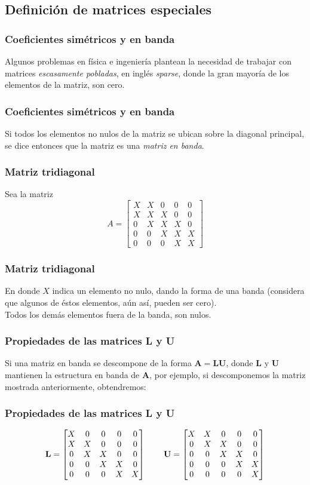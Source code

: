 \subsection{Definición de matrices especiales}
\begin{frame}
\frametitle{Coeficientes simétricos y en banda}
Algunos problemas en física e ingeniería plantean la necesidad de trabajar con matrices \emph{escasamente pobladas}, en inglés \emph{sparse}, donde la gran mayoría de los elementos de la matriz, son cero.
\end{frame}
\begin{frame}
\frametitle{Coeficientes simétricos y en banda}
Si todos los elementos no nulos de la matriz se ubican sobre la diagonal principal, se dice entonces que la matriz es una \emph{matriz en banda}.
\end{frame}
\begin{frame}
\frametitle{Matriz tridiagonal}
Sea la matriz
\[ A = \begin{bmatrix}
X & X & 0 & 0 & 0 \\
X & X & X & 0 & 0 \\
0 & X & X & X & 0 \\
0 & 0 & X & X & X \\
0 & 0 & 0 & X & X
\end{bmatrix}\]
\end{frame}
\begin{frame}
\frametitle{Matriz tridiagonal}
En donde $X$ indica un elemento no nulo, dando la forma de una banda (considera que algunos de éstos elementos, aún así, pueden ser cero).
\\
\bigskip
Todos los demás elementos fuera de la banda, son nulos.
\end{frame}
\begin{frame}
\frametitle{Propiedades de las matrices \textbf{L} y \textbf{U}}
Si una matriz en banda se descompone de la forma $\mathbf{A} = \mathbf{L} \mathbf{U}$, donde $\mathbf{L}$ y $\mathbf{U}$ mantienen la estructura en banda de $\mathbf{A}$, por ejemplo, si descomponemos la matriz mostrada anteriormente, obtendremos:
\end{frame}
\begin{frame}
\frametitle{Propiedades de las matrices \textbf{L} y \textbf{U}}
\[ \mathbf{L} = \begin{bmatrix}
X & 0 & 0 & 0 & 0 \\
X & X & 0 & 0 & 0 \\
0 & X & X & 0 & 0 \\
0 & 0 & X & X & 0 \\
0 & 0 & 0 & X & X
\end{bmatrix} \hspace{0.75cm}
\mathbf{U} = \begin{bmatrix}
X & X & 0 & 0 & 0 \\
0 & X & X & 0 & 0 \\
0 & 0 & X & X & 0 \\
0 & 0 & 0 & X & X \\
0 & 0 & 0 & 0 & X
\end{bmatrix} \]
\end{frame}
